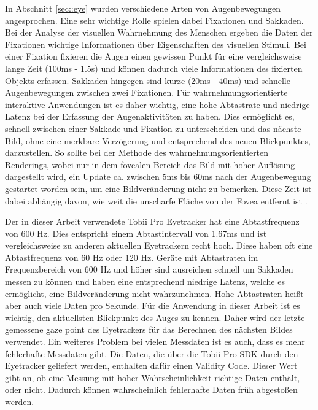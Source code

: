 In Abschnitt \ref{sec::eye} wurden verschiedene Arten von Augenbewegungen angesprochen.
Eine sehr wichtige Rolle spielen dabei Fixationen und Sakkaden.
Bei der Analyse der visuellen Wahrnehmung des Menschen ergeben die Daten der Fixationen wichtige Informationen über Eigenschaften des visuellen Stimuli.
Bei einer Fixation fixieren die Augen einen gewissen Punkt für eine vergleichsweise lange Zeit (100ms - 1.5s) und können dadurch viele Informationen des fixierten Objekts erfassen.
Sakkaden hingegen sind kurze (20ms - 40ms) und schnelle Augenbewegungen zwischen zwei Fixationen.
Für wahrnehmungsorientierte interaktive Anwendungen ist es daher wichtig, eine hohe Abtastrate und niedrige Latenz bei der Erfassung der Augenaktivitäten zu haben.
Dies ermöglicht es, schnell zwischen einer Sakkade und Fixation zu unterscheiden und das nächste Bild, ohne eine merkbare Verzögerung und entsprechend des neuen Blickpunktes, darzustellen.
So sollte bei der Methode des wahrnehmungsorientierten Renderings, wobei nur in dem fovealen Bereich das Bild mit hoher Auflösung dargestellt wird, ein Update ca. zwischen 5ms bis 60ms nach der Augenbewegung gestartet worden sein, um eine Bildveränderung nicht zu bemerken.
Diese Zeit ist dabei abhängig davon, wie weit die unscharfe Fläche von der Fovea entfernt ist \cite{doi:10.1111/cgf.13150}.

Der in dieser Arbeit verwendete Tobii Pro Eyetracker hat eine Abtastfrequenz von 600 Hz.
Dies entspricht einem Abtastintervall von 1.67ms und ist vergleichsweise zu anderen aktuellen Eyetrackern recht hoch.
Diese haben oft eine Abtastfrequenz von 60 Hz oder 120 Hz.
Geräte mit Abtastraten im Frequenzbereich von 600 Hz und höher sind ausreichen schnell um Sakkaden messen zu können und haben eine entsprechend niedrige Latenz, welche es ermöglicht, eine Bildveränderung nicht wahrzunehmen.
Hohe Abtastraten heißt aber auch viele Daten pro Sekunde.
Für die Anwendung in dieser Arbeit ist es wichtig, den aktuellsten Blickpunkt des Auges zu kennen.
Daher wird der letzte gemessene gaze point des Eyetrackers für das Berechnen des nächsten Bildes verwendet.
Ein weiteres Problem bei vielen Messdaten ist es auch, dass es mehr fehlerhafte Messdaten gibt.
Die Daten, die über die Tobii Pro SDK durch den Eyetracker geliefert werden, enthalten dafür einen Validity Code.
Dieser Wert gibt an, ob eine Messung mit hoher Wahrscheinlichkeit richtige Daten enthält, oder nicht.
Dadurch können wahrscheinlich fehlerhafte Daten früh abgestoßen werden.

